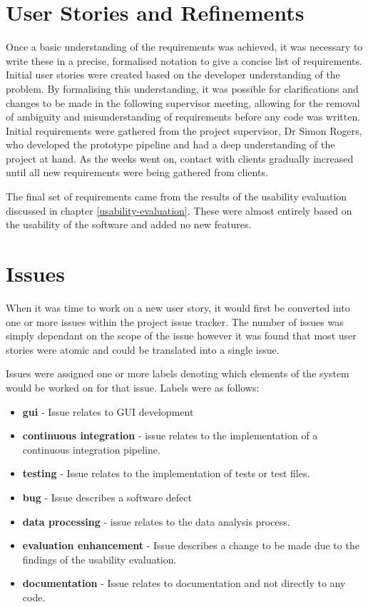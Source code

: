 \documentclass{l4proj}
\begin{document}
\section{User Stories and Refinements} \label{user-stories-and-refinements}
Once a basic understanding of the requirements was achieved, it was necessary to write these in a precise, formalised notation to give a concise list of requirements. Initial user stories were created based on the developer understanding of the problem. By formalising this understanding, it was possible for clarifications and changes to be made in the following supervisor meeting, allowing for the removal of ambiguity and misunderstanding of requirements before any code was written. %
Initial requirements were gathered from the project supervisor, Dr Simon Rogers, who developed the prototype pipeline and had a deep understanding of the project at hand. As the weeks went on, contact with clients gradually increased until all new requirements were being gathered from clients.

The final set of requirements came from the results of the usability evaluation discussed in chapter \ref{usability-evaluation}. These were almost entirely based on the usability of the software and added no new features.

\section{Issues}
When it was time to work on a new user story, it would first be converted into one or more issues within the project issue tracker. The number of issues was simply dependant on the scope of the issue however it was found that most user stories were atomic and could be translated into a single issue.

Issues were assigned one or more labels denoting which elements of the system would be worked on for that issue. Labels were as follows: 
\begin{itemize}
    \item \textbf{gui} - Issue relates to GUI development
    \item \textbf{continuous integration} - issue relates to the implementation of a continuous integration pipeline.
    \item \textbf{testing} - Issue relates to the implementation of tests or test files.
    \item \textbf{bug} - Issue describes a software defect
    \item \textbf{data processing} - issue relates to the data analysis process.
    \item \textbf{evaluation enhancement} - Issue describes a change to be made due to the findings of the usability evaluation.
    \item \textbf{documentation} - Issue relates to documentation and not directly to any code.
\end{itemize}
\end{document}
